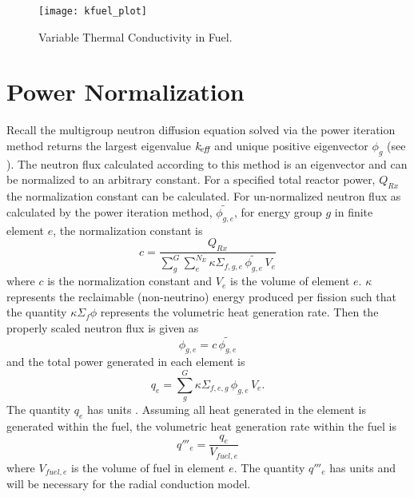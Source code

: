  \begin{figure}
    \centering
    \texttt{[image: kfuel\_plot]}
    \caption{Variable Thermal Conductivity in Fuel.}
    \label{fig:kfuel_plot}
  \end{figure}

\section{Power Normalization}
  Recall the multigroup neutron diffusion equation solved via the power
  iteration method returns the largest eigenvalue $k_{\!\mbox{\scriptsize \em eff}}$ and unique positive
  eigenvector $\phi_g$ (see ). The neutron flux
  calculated according to this method is an eigenvector and can be normalized
  to an arbitrary constant. For a specified total reactor power, $Q_{Rx}$ the
  normalization constant can be calculated. For un-normalized neutron flux as
  calculated by the power iteration method, $\widetilde{\phi_{g,e}}$, for  
  energy group $g$ in finite element $e$, the normalization constant is 
  \begin{equation}
    \label{eq:normalization_c}
    c = \frac{Q_{Rx}}{\sum_{g}^{G} \sum_{e}^{N_E} \kappa \Sigma_{f,g,e} \,
      \widetilde{\phi_{g,e}} \, V_e}
  \end{equation}
  where $c$ is the normalization constant and $V_e$ is the volume of element
  $e$. $\kappa$ represents the reclaimable (non-neutrino) energy produced per
  fission such that the quantity $\kappa \Sigma_f \phi$ represents the
  volumetric heat generation rate. 
  Then the properly scaled neutron flux is given as
  \begin{equation}
    \label{eq:normalization_phi}
    \phi_{g,e} = c \, \widetilde{\phi_{g,e}}
  \end{equation}
  and the total power generated in each element is 
  \begin{equation}
    \label{eq:elementpwr}
    q_{e} = \sum_g^G \kappa \Sigma_{f,e,g} \, \phi_{g,e} \, V_e .
  \end{equation}
  The quantity $q_e$ has units . Assuming all heat generated in the
  element is generated within the fuel, the volumetric heat generation rate 
  within the fuel is 
  \begin{equation}
    \label{eq:elementqppp_fuel}
    q'''_{e} = \frac{q_e}{V_{fuel,e}}
  \end{equation}
  where $V_{fuel,e}$ is the volume of fuel in element $e$. The quantity $q'''_e$
  has units  and will be necessary for the 
  radial conduction model.


